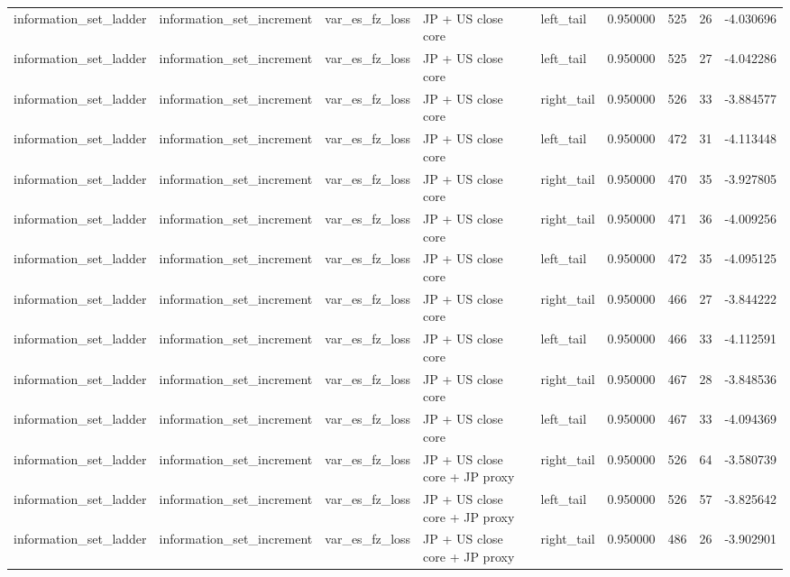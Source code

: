 \begin{tabular}{lllllrrrr}
information\_set\_ladder & information\_set\_increment & var\_es\_fz\_loss & JP + US close core & left\_tail & 0.950000 & 525 & 26 & -4.030696 \\
information\_set\_ladder & information\_set\_increment & var\_es\_fz\_loss & JP + US close core & left\_tail & 0.950000 & 525 & 27 & -4.042286 \\
information\_set\_ladder & information\_set\_increment & var\_es\_fz\_loss & JP + US close core & right\_tail & 0.950000 & 526 & 33 & -3.884577 \\
information\_set\_ladder & information\_set\_increment & var\_es\_fz\_loss & JP + US close core & left\_tail & 0.950000 & 472 & 31 & -4.113448 \\
information\_set\_ladder & information\_set\_increment & var\_es\_fz\_loss & JP + US close core & right\_tail & 0.950000 & 470 & 35 & -3.927805 \\
information\_set\_ladder & information\_set\_increment & var\_es\_fz\_loss & JP + US close core & right\_tail & 0.950000 & 471 & 36 & -4.009256 \\
information\_set\_ladder & information\_set\_increment & var\_es\_fz\_loss & JP + US close core & left\_tail & 0.950000 & 472 & 35 & -4.095125 \\
information\_set\_ladder & information\_set\_increment & var\_es\_fz\_loss & JP + US close core & right\_tail & 0.950000 & 466 & 27 & -3.844222 \\
information\_set\_ladder & information\_set\_increment & var\_es\_fz\_loss & JP + US close core & left\_tail & 0.950000 & 466 & 33 & -4.112591 \\
information\_set\_ladder & information\_set\_increment & var\_es\_fz\_loss & JP + US close core & right\_tail & 0.950000 & 467 & 28 & -3.848536 \\
information\_set\_ladder & information\_set\_increment & var\_es\_fz\_loss & JP + US close core & left\_tail & 0.950000 & 467 & 33 & -4.094369 \\
information\_set\_ladder & information\_set\_increment & var\_es\_fz\_loss & JP + US close core + JP proxy & right\_tail & 0.950000 & 526 & 64 & -3.580739 \\
information\_set\_ladder & information\_set\_increment & var\_es\_fz\_loss & JP + US close core + JP proxy & left\_tail & 0.950000 & 526 & 57 & -3.825642 \\
information\_set\_ladder & information\_set\_increment & var\_es\_fz\_loss & JP + US close core + JP proxy & right\_tail & 0.950000 & 486 & 26 & -3.902901 \\

\end{tabular}
